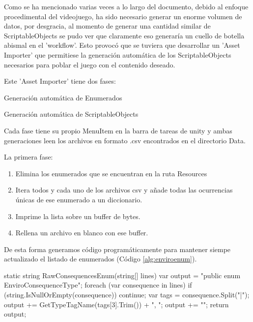 Como se ha mencionado varias veces a lo largo del documento, debido al enfoque procedimental del videojuego, ha sido necesario generar un enorme volumen de datos, por desgracia, al momento de generar una cantidad similar de ScriptableObjects se pudo ver que claramente eso generaría un cuello de botella abismal en el 'workflow'. Esto provocó que se tuviera que desarrollar un 'Asset Importer' que permitiese la generación automática de los ScriptableObjects necesarios para poblar el juego con el contenido deseado.

Este 'Asset Importer' tiene dos fases:
\begin{compactitem}
    \item Generación automática de Enumerados
    \item Generación automática de ScriptableObjects
\end{compactitem}

Cada fase tiene su propio MenuItem en la barra de tareas de unity y ambas generaciones leen los archivos en formato .csv encontrados en el directorio \textunderscore Data. 

La primera fase:
\begin{enumerate}
    \item Elimina los enumerados que se encuentran en la ruta Resources
    \item Itera todos y cada uno de los archivos csv y añade todas las ocurrencias únicas de ese enumerado a un diccionario.
    \item Imprime la lista sobre un buffer de bytes.
    \item Rellena un archivo en blanco con ese buffer.
\end{enumerate} 

De esta forma generamos código programáticamente para mantener siempe actualizado el listado de enumerados (Código \ref{alg:enviroenum}).

\begin{mypython}[caption={Código para autogenerar el enumerado de EnviroConsequences.},label={alg:enviroenum}]
static string RawConsequencesEnum(string[] lines)
{
    var output = "public enum EnviroConsequenceType{";
    foreach (var consequence in lines)
    {
        if (string.IsNullOrEmpty(consequence))
        {
            continue;
        }
        var tags = consequence.Split("|");
        output += GetTypeTagName(tags[3].Trim()) + ", ";
    }
    output += "}";
    return output;
}
\end{mypython}

